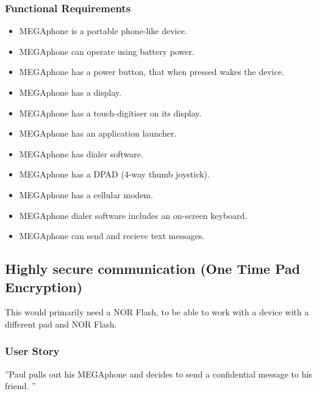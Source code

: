         \subsubsection{Functional Requirements}
        \begin{itemize}
        \item MEGAphone is a portable phone-like device.
        \item MEGAphone can operate using battery power.
        \item MEGAphone has a power button, that when pressed wakes the device.
        \item MEGAphone has a display.
        \item MEGAphone has a touch-digitiser on its display.
        \item MEGAphone has an application launcher.
        \item MEGAphone has dialer software.
        \item MEGAphone has a DPAD (4-way thumb joystick).
        \item MEGAphone has a cellular modem.
	\item MEGAphone dialer software includes an on-screen keyboard.
	\item MEGAphone can send and recieve text messages.
        \end{itemize}

\subsection{Highly secure communication (One Time Pad Encryption)}
	This would primarily need a NOR Flash, to be able to work with a device with a different pad and NOR Flash.\\

	\subsubsection{User Story}
	''Paul pulls out his MEGAphone and decides to send a confidential message to his friend. ''

